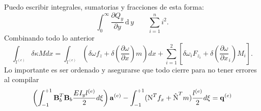 \documentclass[a4paper,12pt]{article} %
\begin{document}
	Puedo escribir integrales, sumatorias y fracciones de esta forma:
	\begin{equation}
	\int_{0}^{\infty}\frac{\partial Q_{y}}{\partial y}\,\text{d}\,y \qquad \sum_{i=1}^{n}i^2.
	\end{equation}
	Combinando todo lo anterior
	\begin{equation}
	\int_{l^{(e)}} \delta\kappa Mdx = \int_{l^{(e)}} \left( \delta \omega f_z + \delta\left( \frac{\partial\omega}{\partial x}\right) m  \right) dx + \sum_{i=1}^{2} \left[ \delta\omega_i F_{z_i} + \delta \left( \frac{\partial\omega}{\partial x}_i\right) M_i \right].
	\end{equation}
	Lo importante es ser ordenado y asegurarse que todo cierre para no tener errores al compilar
	\begin{equation}
	\left( \int_{-1}^{+1} \textbf{B}_b^T \textbf{B}_b \frac{EI_y l^{(e)}}{2}d\xi\right)\text{\textbf{a}}^{(e)} - \int_{-1}^{+1} (\text{N}^T f_x + \hat{\text{N}}^T m) \frac{l^{(e)}}{2}d\xi = \text{\textbf{q}}^{(e)}
	\end{equation}
\end{document}

